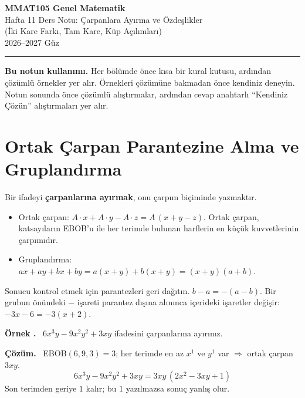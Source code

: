 \documentclass[11pt,a4paper]{article}
\newcounter{ornek}
\newenvironment{ornek}{\refstepcounter{ornek}\par\medskip\noindent\textbf{\color{anamavi}Örnek \theornek.}\ }{\par}
\newenvironment{cozum}{\begin{tcolorbox}[colback=cozumyesil!6,colframe=cozumyesil,boxrule=0.5pt,left=4pt,right=4pt,top=2pt,bottom=2pt,breakable]\textbf{\color{cozumyesil}Çözüm.}\ }{\end{tcolorbox}}
\begin{document}
\begin{minipage}[c]{\textwidth}
{\LARGE\bfseries\color{anamavi} MMAT105 Genel Matematik}\\[4pt]
{\large Hafta 11 Ders Notu: Çarpanlara Ayırma ve Özdeşlikler\\ (İki Kare Farkı, Tam Kare, Küp Açılımları)}\\[6pt]
{\small 2026--2027 Güz}
\end{minipage}

\vspace{4pt}\noindent\textcolor{anamavi}{\rule{\textwidth}{1pt}}

\textbf{Bu notun kullanımı.} Her bölümde önce kısa bir kural kutusu, ardından çözümlü örnekler yer alır. Örnekleri çözümüne bakmadan önce kendiniz deneyin. Notun sonunda önce çözümlü alıştırmalar, ardından cevap anahtarlı ``Kendiniz Çözün'' alıştırmaları yer alır.

\section{Ortak Çarpan Parantezine Alma ve Gruplandırma}

\begin{kural}[Kural]
Bir ifadeyi \textbf{çarpanlarına ayırmak}, onu çarpım biçiminde yazmaktır.
\begin{itemize}[leftmargin=*,itemsep=1pt]
\item Ortak çarpan: \(A\cdot x+A\cdot y-A\cdot z=A\,(x+y-z)\). Ortak çarpan, katsayıların EBOB'u ile her terimde bulunan harflerin en küçük kuvvetlerinin çarpımıdır.
\item Gruplandırma: \(ax+ay+bx+by=a(x+y)+b(x+y)=(x+y)(a+b)\).
\end{itemize}
\end{kural}

\begin{dikkat}
Sonucu kontrol etmek için parantezleri geri dağıtın. \(b-a=-(a-b)\). Bir grubun önündeki \(-\) işareti parantez dışına alınınca içerideki işaretler değişir: \(-3x-6=-3(x+2)\).
\end{dikkat}

\begin{ornek}
\(6x^3y-9x^2y^2+3xy\) ifadesini çarpanlarına ayırınız.
\end{ornek}
\begin{cozum}
EBOB\((6,9,3)=3\); her terimde en az \(x^1\) ve \(y^1\) var \(\Rightarrow\) ortak çarpan \(3xy\).
\[6x^3y-9x^2y^2+3xy=3xy\,(2x^2-3xy+1)\]
Son terimden geriye \(1\) kalır; bu \(1\) yazılmazsa sonuç yanlış olur.
\end{cozum}
\end{document}
